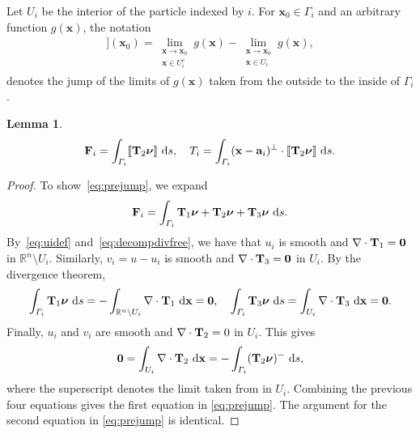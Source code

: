 \documentclass[lineno]{jfm}
\newtheorem{lemma}{Lemma}
\renewcommand{\aa}{\mathbf{a}}
\newcommand{\FF}{\mathbf{F}}
\newcommand{\nnu}{\boldsymbol{\nu}}
\newcommand{\xx}{\mathbf{x}}
\newcommand{\jump}[1]{[\![ #1 ]\!]}
\begin{document}
Let $U_i$ be the interior of the particle indexed by $i$. For $\xx_0
\in \Gamma_i$ and an arbitrary function $g(\xx)$, the notation
\begin{align}
  \jump{g}(\xx_0) = \lim_{\substack{\xx \to \xx_0 \\ \xx \in U_i^c}}g(\xx)  - 
                    \lim_{\substack{\xx \to \xx_0 \\ \xx \in U_i}}g(\xx),
\end{align}
denotes the jump of the limits of $g(\xx)$ taken from the outside to
the inside of $\Gamma_i$.
\begin{lemma}
\begin{align}
  \label{eq:prejump}
  \FF_i = \int_{\Gamma_i} \jump{{\bf T}_2  \nnu}  \, \dif s,\quad
  T_i = \int_{\Gamma_i} (\xx - \aa_i)^{\perp} \cdot \jump{{\bf T}_2 \nnu} \, \dif s.
\end{align}
\end{lemma}
\begin{proof}
To show~\eqref{eq:prejump}, we expand
\begin{align}
  \FF_i = \int_{\Gamma_i} {\bf T}_1\nnu + 
    {\bf T}_2\nnu + {\bf T}_3\nnu\,\dif s.
\end{align}
By~\eqref{eq:uidef} and~\eqref{eq:decompdivfree}, we have that $u_i$ is
smooth and $\nabla \cdot {\bf T}_1 = \mathbf{0}$ in $\mathbb{R}^n
\setminus U_i$. Similarly, $v_i = u - u_i$ is smooth and $\nabla \cdot
{\bf T}_3 = \mathbf{0}$ in $U_i$. By the divergence theorem,  
\begin{align}
  \int_{\Gamma_i}  {\bf T}_1\nnu \,\dif s
  = -\int_{\mathbb{R}^n \setminus U_i} \nabla \cdot {\bf T}_1 \,\dif \xx = \mathbf{0},\quad
    \int_{\Gamma_i}  {\bf T}_3 \nnu\,\dif s
  = \int_{U_i} \nabla \cdot {\bf T}_3 \,\dif \xx = \mathbf{0}.
\end{align}
Finally, $u_i$ and $v_i$ are smooth and $\nabla \cdot {\bf T}_2= 0$ in $U_i$. This gives
\begin{align}
  \mathbf{0} = \int_{U_i} \nabla \cdot {\bf T}_2 \, \dif \xx = -\int_{\Gamma_i}  
    ({\bf T}_2 \nnu)^-\,\dif s,
\end{align}
where the superscript denotes the limit taken from in $U_i$.  
Combining the previous four equations gives the first equation in \eqref{eq:prejump}.
The argument for the second equation in \eqref{eq:prejump} is identical. 
\end{proof}
\end{document}
